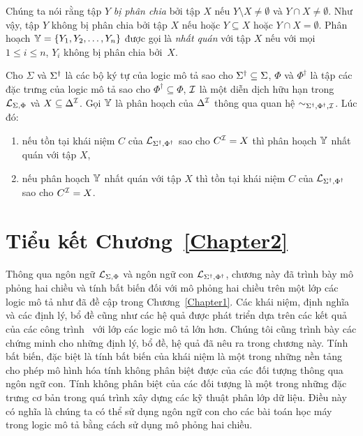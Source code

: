 Chúng ta nói rằng tập $Y$ {\em bị phân chia} bởi tập $X$ nếu $Y \setminus X \neq \emptyset$ và $Y \cap X \neq \emptyset$. Như vậy, tập $Y$ không bị phân chia bởi tập $X$ nếu hoặc $Y \subseteq X$ hoặc $Y \cap X = \emptyset$.
Phân hoạch $\mathbb{Y} = \{Y_1, Y_2, \ldots,Y_n\}$ được gọi là {\em nhất quán} với tập $X$ nếu với mọi $1 \leq i \leq n$, $Y_i$ không bị phân chia bởi~$X$.

\begin{Theorem}
\label{th:Consistent}
	Cho $\Sigma$ và $\Sigma^\dag$ là các bộ ký tự của logic mô tả sao cho $\Sigma^\dag \subseteq \Sigma$, $\Phi$ và $\Phi^\dag$ là tập các đặc trưng của logic mô tả sao cho $\Phi^\dag \subseteq \Phi$, $\mathcal{I}$ là một diễn dịch hữu hạn trong $\mathcal{L}_{\Sigma,\Phi}$ và $X \subseteq \Delta^{\mathcal{I}}$. Gọi $\mathbb{Y}$ là phân hoạch của $\Delta^{\mathcal{I}}$ thông qua quan hệ $\sim_{\Sigma^\dag,\Phi^\dag,\mathcal{I}}$. Lúc đó:
	\begin{enumerate}
		\item nếu tồn tại khái niệm $C$ của $\mathcal{L}_{\Sigma^\dag,\Phi^\dag}$ sao cho $C^{\mathcal{I}} = X$ thì phân hoạch $\mathbb{Y}$ nhất quán với tập $X$,  
		\item nếu phân hoạch $\mathbb{Y}$ nhất quán với tập $X$ thì tồn tại khái niệm $C$ của $\mathcal{L}_{\Sigma^\dag,\Phi^\dag}$ sao cho $C^{\mathcal{I}} = X$.\myend
	\end{enumerate}
\end{Theorem}

\section*{Tiểu kết Chương~\ref{Chapter2}}
\label{sec:Chap2.Summary}
Thông qua ngôn ngữ $\mathcal{L}_{\Sigma,\Phi}$ và ngôn ngữ con $\mathcal{L}_{\Sigma^\dag,\Phi^\dag}$, chương này đã trình bày mô phỏng hai chiều và tính bất biến đối với mô phỏng hai chiều trên một lớp các logic mô tả như đã đề cập trong Chương~\ref{Chapter1}. Các khái niệm, định nghĩa và các định lý, bổ đề cũng như các hệ quả được phát triển dựa trên các kết quả của các công trình~\cite{Divroodi2011B,Nguyen2013} với lớp các logic mô tả lớn hơn. Chúng tôi cũng trình bày các chứng minh cho những định lý, bổ đề, hệ quả đã nêu ra trong chương này. Tính bất biến, đặc biệt là tính bất biến của khái niệm là một trong những nền tảng cho phép mô hình hóa tính không phân biệt được của các đối tượng thông qua ngôn ngữ con. Tính không phân biệt của các đối tượng là một trong những đặc trưng cơ bản trong quá trình xây dựng các kỹ thuật phân lớp dữ liệu. Điều này có nghĩa là chúng ta có thể sử dụng ngôn ngữ con cho các bài toán học máy trong logic mô tả bằng cách sử dụng mô phỏng hai chiều.
\cleardoublepage